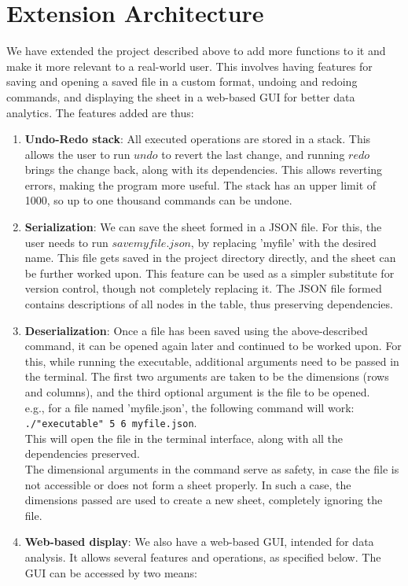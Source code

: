 \documentclass{article}
\begin{document}
\section{Extension Architecture}
We have extended the project described above to add more functions to it and make it more relevant to a real-world user. This involves having features for saving and opening a saved file in a custom format, undoing and redoing commands, and displaying the sheet in a web-based GUI for better data analytics.
The features added are thus:
\begin{enumerate}
    \item \textbf{Undo-Redo stack}: All executed operations are stored in a stack. This allows the user to run $undo$ to revert the last change, and running $redo$ brings the change back, along with its dependencies. This allows reverting errors, making the program more useful. 
    The stack has an upper limit of 1000, so up to one thousand commands can be undone.
    \item \textbf{Serialization}: We can save the sheet formed in a JSON file. For this, the user needs to run $save myfile.json$, by replacing 'myfile' with the desired name. This file gets saved in the project directory directly, and the sheet can be further worked upon. This feature can be used as a simpler substitute for version control, though not completely replacing it. The JSON file formed contains descriptions of all nodes in the table, thus preserving dependencies.
    \item \textbf{Deserialization}: Once a file has been saved using the above-described command, it can be opened again later and continued to be worked upon. For this, while running the executable, additional arguments need to be passed in the terminal. The first two arguments are taken to be the dimensions (rows and columns), and the third optional argument is the file to be opened.\\ e.g., for a file named 'myfile.json', the following command will work: \texttt{./"executable" 5 6 myfile.json}.\\ This will open the file in the terminal interface, along with all the dependencies preserved.\\The dimensional arguments in the command serve as safety, in case the file is not accessible or does not form a sheet properly. In such a case, the dimensions passed are used to create a new sheet, completely ignoring the file.
    \item \textbf{Web-based display}: We also have a web-based GUI, intended for data analysis. It allows several features and operations, as specified below. The GUI can be accessed by two means:

\end{enumerate}
\end{document}
